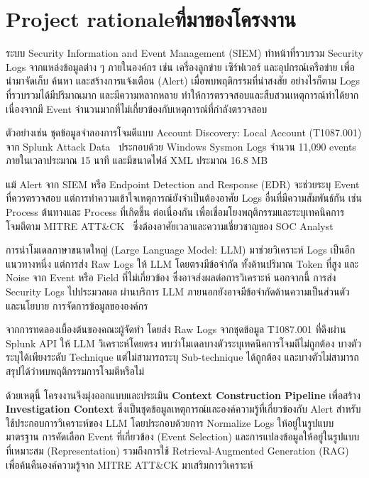 \section{\ifenglish Project rationale\else ที่มาของโครงงาน\fi}
ระบบ Security Information and Event Management (SIEM) ทำหน้าที่รวบรวม
Security Logs จากแหล่งข้อมูลต่าง ๆ ภายในองค์กร เช่น เครื่องลูกข่าย
เซิร์ฟเวอร์ และอุปกรณ์เครือข่าย เพื่อนำมาจัดเก็บ ค้นหา และสร้างการแจ้งเตือน
(Alert) เมื่อพบพฤติกรรมที่น่าสงสัย อย่างไรก็ตาม Logs ที่รวบรวมได้มีปริมาณมาก
และมีความหลากหลาย ทำให้การตรวจสอบและสืบสวนเหตุการณ์ทำได้ยาก
เนื่องจากมี Event จำนวนมากที่ไม่เกี่ยวข้องกับเหตุการณ์ที่กำลังตรวจสอบ

ตัวอย่างเช่น ชุดข้อมูลจำลองการโจมตีแบบ Account Discovery: Local Account
(T1087.001) จาก Splunk Attack Data~\cite{splunk-attack-data}
ประกอบด้วย Windows Sysmon Logs จำนวน 11,090 events ภายในเวลาประมาณ
15 นาที และมีขนาดไฟล์ XML ประมาณ 16.8 MB

แม้ Alert จาก SIEM หรือ Endpoint Detection and Response (EDR) 
จะช่วยระบุ Event ที่ควรตรวจสอบ แต่การทำความเข้าใจเหตุการณ์ยังจำเป็นต้องอาศัย
Logs อื่นที่มีความสัมพันธ์กัน เช่น Process ต้นทางและ Process ที่เกิดขึ้น
ต่อเนื่องกัน เพื่อเชื่อมโยงพฤติกรรมและระบุเทคนิคการโจมตีตาม MITRE
ATT\&CK~\cite{mitre-attack} ซึ่งต้องอาศัยเวลาและความเชี่ยวชาญของ
SOC Analyst

การนำโมเดลภาษาขนาดใหญ่ (Large Language Model: LLM) มาช่วยวิเคราะห์
Logs เป็นอีกแนวทางหนึ่ง แต่การส่ง Raw Logs ให้ LLM โดยตรงมีข้อจำกัด
ทั้งด้านปริมาณ Token ที่สูง และ Noise จาก Event หรือ Field ที่ไม่เกี่ยวข้อง
ซึ่งอาจส่งผลต่อการวิเคราะห์ นอกจากนี้ การส่ง Security Logs ไปประมวลผล
ผ่านบริการ LLM ภายนอกยังอาจมีข้อจำกัดด้านความเป็นส่วนตัวและนโยบาย
การจัดการข้อมูลขององค์กร

จากการทดลองเบื้องต้นของคณะผู้จัดทำ โดยส่ง Raw Logs จากชุดข้อมูล
T1087.001 ที่ดึงผ่าน Splunk API ให้ LLM วิเคราะห์โดยตรง พบว่าโมเดลบางตัวระบุเทคนิคการโจมตีไม่ถูกต้อง
บางตัวระบุได้เพียงระดับ Technique แต่ไม่สามารถระบุ Sub-technique ได้ถูกต้อง
และบางตัวไม่สามารถสรุปได้ว่าพบพฤติกรรมการโจมตีหรือไม่

ด้วยเหตุนี้ โครงงานจึงมุ่งออกแบบและประเมิน
\textbf{Context Construction Pipeline} เพื่อสร้าง
\textbf{Investigation Context} ซึ่งเป็นชุดข้อมูลเหตุการณ์และองค์ความรู้ที่เกี่ยวข้องกับ
Alert สำหรับใช้ประกอบการวิเคราะห์ของ LLM โดยประกอบด้วยการ 
Normalize Logs ให้อยู่ในรูปแบบมาตรฐาน การคัดเลือก Event ที่เกี่ยวข้อง
(Event Selection) และการแปลงข้อมูลให้อยู่ในรูปแบบที่เหมาะสม
(Representation) รวมถึงการใช้ Retrieval-Augmented Generation (RAG)
~\cite{lewis2020rag} เพื่อค้นคืนองค์ความรู้จาก MITRE ATT\&CK
มาเสริมการวิเคราะห์

